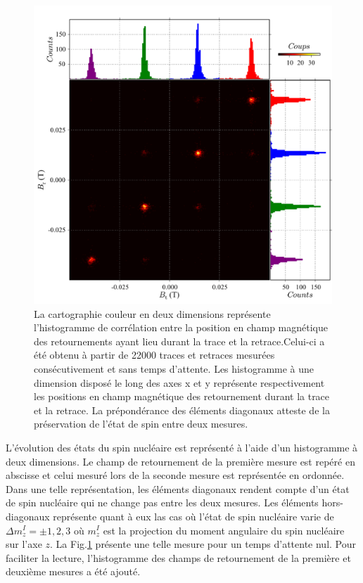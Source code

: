 \begin{figure}
\includegraphics[scale=0.45]{Resultats/Hist2D/Hist2D.pdf} 
\caption{La cartographie couleur en deux dimensions représente l’histogramme de corrélation entre la position en champ magnétique des retournements ayant lieu durant la trace et la retrace.Celui-ci a été obtenu à partir de 22000 traces et retraces mesurées consécutivement et sans temps d'attente. Les histogramme à une dimension disposé le long des axes x et y représente respectivement les positions en champ magnétique des retournement durant la trace et la retrace. La prépondérance des éléments diagonaux atteste de la préservation de l'état de spin entre deux mesures.}
\label{correlations}
\end{figure}

L'évolution des états du spin nucléaire est représenté à l'aide d'un histogramme à deux dimensions. Le champ de retournement de la première mesure est repéré en abscisse et celui mesuré lors de la seconde mesure est représentée en ordonnée. Dans une telle représentation, les éléments diagonaux rendent compte d'un état de spin nucléaire qui ne change pas entre les deux mesures. Les éléments hors-diagonaux représente quant à eux las cas où l'état de spin nucléaire varie de $\Delta m_z^I = \pm 1,2,3$ où $m_z^I$ est la projection du moment angulaire du spin nucléaire sur l'axe $z$. La Fig.\ref{correlations} présente une telle mesure pour un temps d'attente nul. Pour faciliter la lecture, l'histogramme des champs de retournement de la première et deuxième mesures a été ajouté.


